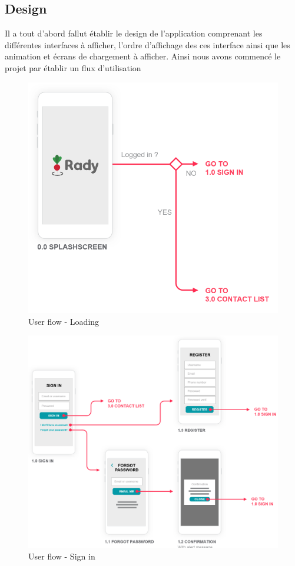 \documentclass[french]{article}
\begin{document}
	\subsection{Design}
	
	Il a tout d'abord fallut établir le design de l'application comprenant les différentes interfaces à afficher, l'ordre d'affichage des ces interface ainsi que les animation et écrans de chargement à afficher. Ainsi nous avons commencé le projet par établir un flux d'utilisation
	
	\begin{figure}[H]
		\centering
		\includegraphics[scale=0.6]{../user-flow/user-flow-1.png}
		\caption{User flow - Loading}
		\label{User flow - Loading}
	\end{figure}
	
	\begin{figure}[H]
		\centering
		\includegraphics[scale=0.6]{../user-flow/user-flow-2.png}
		\caption{User flow - Sign in}
		\label{User flow - Sign in}
	\end{figure}
	
\end{document}
